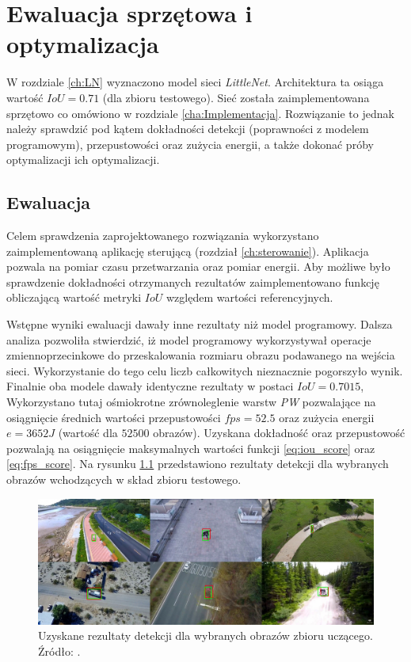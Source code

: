 \chapter{Ewaluacja sprzętowa i optymalizacja}
\label{cha:Optymalizacja}

W rozdziale \ref{ch:LN} wyznaczono model sieci \emph{LittleNet}. 
Architektura ta osiąga wartość $IoU = 0.71$ (dla zbioru testowego). 
Sieć została zaimplementowana sprzętowo co omówiono w rozdziale \ref{cha:Implementacja}.
Rozwiązanie to jednak należy sprawdzić pod kątem dokładności detekcji (poprawności z modelem programowym), przepustowości oraz zużycia energii, a także dokonać próby optymalizacji ich optymalizacji. 


\section{Ewaluacja}
Celem sprawdzenia zaprojektowanego rozwiązania wykorzystano zaimplementowaną aplikację sterującą (rozdział \ref{ch:sterowanie}).
Aplikacja pozwala na pomiar czasu przetwarzania oraz pomiar energii.
Aby możliwe było sprawdzenie dokładności otrzymanych rezultatów zaimplementowano funkcję obliczającą wartość metryki $IoU$ względem wartości referencyjnych.

Wstępne wyniki ewaluacji dawały inne rezultaty niż model programowy.
Dalsza analiza pozwoliła stwierdzić, iż model programowy wykorzystywał operacje zmiennoprzecinkowe do przeskalowania rozmiaru obrazu podawanego na wejścia sieci.
Wykorzystanie do tego celu liczb całkowitych nieznacznie pogorszyło wynik.
Finalnie oba modele dawały identyczne rezultaty w postaci $IoU = 0.7015$, 
Wykorzystano tutaj ośmiokrotne zrównoleglenie warstw \emph{PW} pozwalające na osiągnięcie średnich wartości przepustowości $fps = 52.5$ oraz zużycia energii $e = 3652 J$ (wartość dla $52 500$ obrazów). 
Uzyskana dokładność oraz przepustowość pozwalają na osiągnięcie maksymalnych wartości funkcji \eqref{eq:iou_score} oraz \eqref{eq:fps_score}.
Na rysunku \ref{fig:results} przedstawiono rezultaty detekcji dla wybranych obrazów wchodzących w skład zbioru testowego.

\begin{figure}
    \centering
    \includegraphics[width=0.9\linewidth]{images/results.png}
    \caption{Uzyskane rezultaty detekcji dla wybranych obrazów zbioru uczącego. 
    Źródło: \cite{dac_sdc_2021}.}
    \label{fig:results}
\end{figure}

